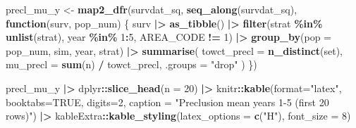 \documentclass[
]{article}
\newenvironment{Shaded}{\begin{snugshade}}{\end{snugshade}}
\newcommand{\AttributeTok}[1]{\textcolor[rgb]{0.13,0.29,0.53}{#1}}
\newcommand{\ConstantTok}[1]{\textcolor[rgb]{0.56,0.35,0.01}{#1}}
\newcommand{\ControlFlowTok}[1]{\textcolor[rgb]{0.13,0.29,0.53}{\textbf{#1}}}
\newcommand{\DecValTok}[1]{\textcolor[rgb]{0.00,0.00,0.81}{#1}}
\newcommand{\FunctionTok}[1]{\textcolor[rgb]{0.13,0.29,0.53}{\textbf{#1}}}
\newcommand{\NormalTok}[1]{#1}
\newcommand{\OtherTok}[1]{\textcolor[rgb]{0.56,0.35,0.01}{#1}}
\newcommand{\SpecialCharTok}[1]{\textcolor[rgb]{0.81,0.36,0.00}{\textbf{#1}}}
\newcommand{\StringTok}[1]{\textcolor[rgb]{0.31,0.60,0.02}{#1}}
\begin{document}
\begin{Shaded}
\begin{Highlighting}[]
\NormalTok{precl\_mu\_y }\OtherTok{\textless{}{-}} \FunctionTok{map2\_dfr}\NormalTok{(survdat\_sq, }\FunctionTok{seq\_along}\NormalTok{(survdat\_sq), }\ControlFlowTok{function}\NormalTok{(surv, pop\_num) \{}
\NormalTok{  surv }\SpecialCharTok{|\textgreater{}}
    \FunctionTok{as\_tibble}\NormalTok{() }\SpecialCharTok{|\textgreater{}}
    \FunctionTok{filter}\NormalTok{(strat }\SpecialCharTok{\%in\%} \FunctionTok{unlist}\NormalTok{(strat), year }\SpecialCharTok{\%in\%} \DecValTok{1}\SpecialCharTok{:}\DecValTok{5}\NormalTok{, AREA\_CODE }\SpecialCharTok{!=} \DecValTok{1}\NormalTok{) }\SpecialCharTok{|\textgreater{}}
    \FunctionTok{group\_by}\NormalTok{(}\AttributeTok{pop =}\NormalTok{ pop\_num, sim, year, strat) }\SpecialCharTok{|\textgreater{}}
    \FunctionTok{summarise}\NormalTok{(}
      \AttributeTok{towct\_precl =} \FunctionTok{n\_distinct}\NormalTok{(set),}
      \AttributeTok{mu\_precl =} \FunctionTok{sum}\NormalTok{(n) }\SpecialCharTok{/}\NormalTok{ towct\_precl,}
      \AttributeTok{.groups =} \StringTok{"drop"}
\NormalTok{    )}
\NormalTok{\})}

\NormalTok{precl\_mu\_y }\SpecialCharTok{|\textgreater{}} 
\NormalTok{   dplyr}\SpecialCharTok{::}\FunctionTok{slice\_head}\NormalTok{(}\AttributeTok{n =} \DecValTok{20}\NormalTok{) }\SpecialCharTok{|\textgreater{}}
\NormalTok{  knitr}\SpecialCharTok{::}\FunctionTok{kable}\NormalTok{(}\AttributeTok{format=}\StringTok{"latex"}\NormalTok{, }\AttributeTok{booktabs=}\ConstantTok{TRUE}\NormalTok{, }\AttributeTok{digits=}\DecValTok{2}\NormalTok{,}
              \AttributeTok{caption =} \StringTok{"Preclusion mean years 1{-}5 (first 20 rows)"}\NormalTok{) }\SpecialCharTok{|\textgreater{}}
\NormalTok{   kableExtra}\SpecialCharTok{::}\FunctionTok{kable\_styling}\NormalTok{(}\AttributeTok{latex\_options =} \FunctionTok{c}\NormalTok{(}\StringTok{"H"}\NormalTok{), }\AttributeTok{font\_size =} \DecValTok{8}\NormalTok{)}
\end{Highlighting}
\end{Shaded}
\end{document}
